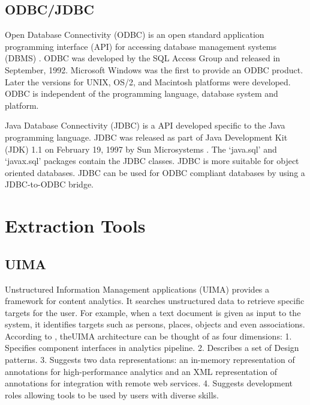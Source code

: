 \subsection{ ODBC/JDBC}

     Open Database Connectivity (ODBC) is an open standard application
     programming interface (API) for accessing database management
     systems (DBMS) \cite{www-odbc}. ODBC was developed by the SQL
     Access Group and released in September, 1992. Microsoft Windows
     was the first to provide an ODBC product. Later the versions for
     UNIX, OS/2, and Macintosh platforms were developed. ODBC is
     independent of the programming language, database system and
     platform.

     Java Database Connectivity (JDBC) is a API developed specific to
     the Java programming language. JDBC was released as part of Java
     Development Kit (JDK) 1.1 on February 19, 1997 by Sun
     Microsystems \cite{www-jdbc}. The ‘java.sql’ and ‘javax.sql’
     packages contain the JDBC classes. JDBC is more suitable for
     object oriented databases. JDBC can be used for ODBC compliant
     databases by using a JDBC-to-ODBC bridge.

\section{Extraction Tools}


\subsection{ UIMA}

     Unstructured Information Management applications (UIMA) provides
     a framework for content analytics. It searches unstructured data
     to retrieve specific targets for the user. For example, when a
     text document is given as input to the system, it identifies
     targets such as persons, places, objects and even
     associations. According to , \cite{www-wiki-uima} theUIMA
     architecture can be thought of as four dimensions: 1. Specifies
     component interfaces in analytics pipeline.  2. Describes a set
     of Design patterns. 3. Suggests two data representations: an
     in-memory representation of annotations for high-performance
     analytics and an XML representation of annotations for
     integration with remote web services. 4. Suggests development
     roles allowing tools to be used by users with diverse skills.

